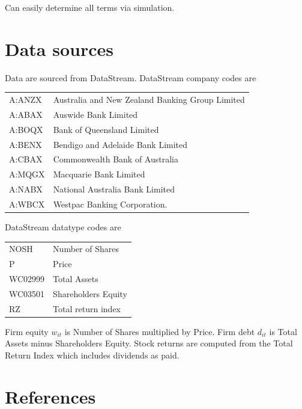 \documentclass[authoryear]{elsarticle}
\begin{document}
Can easily determine all terms via simulation.


\section{Data sources}\label{data}

Data are sourced from DataStream. DataStream company codes are 
\begin{center}
	\begin{tabular}{ll}
A:ANZX & Australia and New Zealand Banking Group Limited\\
A:ABAX & Auswide Bank Limited\\
A:BOQX & Bank of Queensland Limited\\
A:BENX & Bendigo and Adelaide Bank Limited\\
A:CBAX & Commonwealth Bank of Australia\\
A:MQGX & Macquarie Bank Limited\\
A:NABX & National Australia Bank Limited\\
A:WBCX & Westpac Banking Corporation.\\	
\end{tabular}
\end{center}

DataStream datatype codes are
\begin{center}
	\begin{tabular}{ll}
	NOSH & Number of Shares\\
	P & Price\\
	WC02999 & Total Assets\\
	WC03501 & Shareholders Equity\\
	RZ & Total return index\\
\end{tabular}
\end{center}

Firm equity $w_{it}$ is Number of Shares multiplied by Price. Firm debt $d_{it}$ is Total Assets minus Shareholders Equity. Stock returns are computed from the Total Return Index which includes dividends as paid. 


\section*{References}

\end{document}
